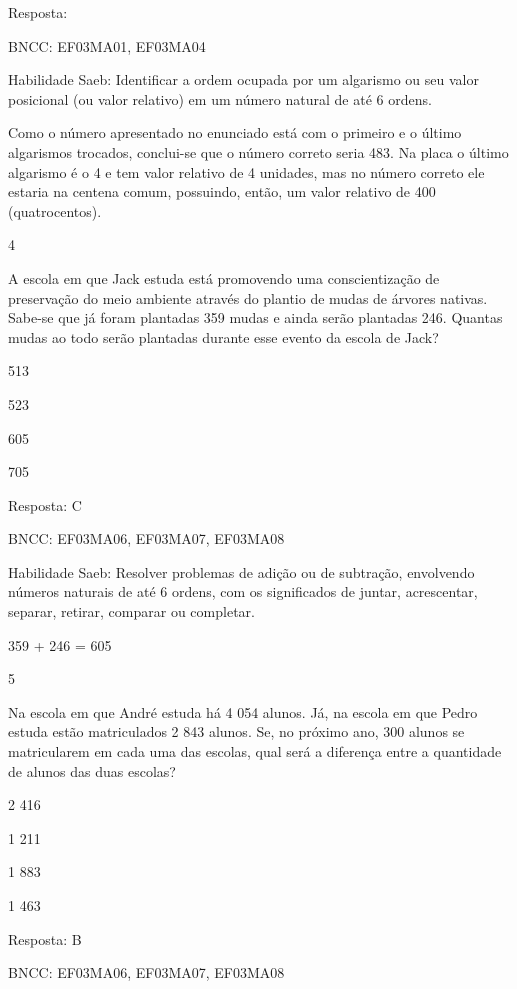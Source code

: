 \begin{escolha}
Resposta:

BNCC: EF03MA01, EF03MA04

Habilidade Saeb: Identificar a ordem ocupada por um algarismo ou seu
valor posicional (ou valor relativo) em um número natural de até 6
ordens.

Como o número apresentado no enunciado está com o primeiro e o último
algarismos trocados, conclui-se que o número correto seria 483. Na placa
o último algarismo é o 4 e tem valor relativo de 4 unidades, mas no
número correto ele estaria na centena comum, possuindo, então, um valor
relativo de 400 (quatrocentos).

\num{4}

A escola em que Jack estuda está promovendo uma conscientização de
preservação do meio ambiente através do plantio de mudas de árvores
nativas. Sabe-se que já foram plantadas 359 mudas e ainda serão
plantadas 246. Quantas mudas ao todo serão plantadas durante esse evento
da escola de Jack?

\begin{escolha}
\item
  513
\item
  523
\item
  605
\item
  705
\end{escolha}

Resposta: C

BNCC: EF03MA06, EF03MA07, EF03MA08

Habilidade Saeb: Resolver problemas de adição ou de subtração,
envolvendo números naturais de até 6 ordens, com os significados de
juntar, acrescentar, separar, retirar, comparar ou completar.

359 + 246 = 605

\num{5}

Na escola em que André estuda há 4 054 alunos. Já, na escola em que
Pedro estuda estão matriculados 2 843 alunos. Se, no próximo ano, 300
alunos se matricularem em cada uma das escolas, qual será a diferença
entre a quantidade de alunos das duas escolas?

\begin{escolha}
\item
  2 416
\item
  1 211
\item
  1 883
\item
  1 463
\end{escolha}

Resposta: B

BNCC: EF03MA06, EF03MA07, EF03MA08


\end{escolha}
